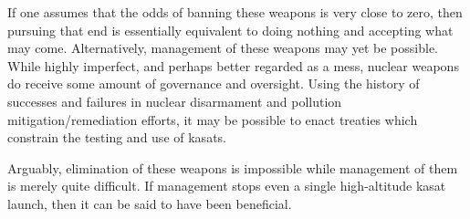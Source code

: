 If one assumes that the odds of banning these weapons is very close to
zero, then pursuing that end is essentially equivalent to doing
nothing and accepting what may come.  Alternatively, management of
these weapons may yet be possible.  While highly imperfect, and
perhaps better regarded as a mess, nuclear weapons do receive some
amount of governance and oversight.  Using the history of successes
and failures in nuclear disarmament and pollution
mitigation/remediation efforts, it may be possible to enact treaties
which constrain the testing and use of \acp{kasat}.

Arguably, elimination of these weapons is impossible while management
of them is merely quite difficult.  If management stops even a single
high-altitude \ac{kasat} launch, then it can be said to have been
beneficial.
